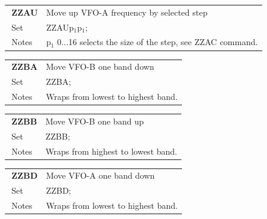 \documentclass[12pt]{book}
\begin{document}
\begin{center}
\begin{tabular}{|p{2cm}|p{11cm}|}
\toprule
$\phantom{\Big|}$\textbf{\large ZZAU} & Move up VFO-A frequency by selected step \\\cline{1-2}
$\phantom{\Big|}${\large Set} & {ZZAUp$_1$p$_1$;} \\\hline
$\phantom{\Big|}${\large Notes} & \multicolumn{1}{|p{11cm}|}{p$_1$ 0...16 selects the size of the step, see ZZAC command.} \\
\bottomrule
\end{tabular}
\end{center}

\begin{center}
\begin{tabular}{|p{2cm}|p{11cm}|}
\toprule
$\phantom{\Big|}$\textbf{\large ZZBA} & Move VFO-B one band down \\\cline{1-2}
$\phantom{\Big|}${\large Set} & {ZZBA;} \\\hline
$\phantom{\Big|}${\large Notes} & \multicolumn{1}{|p{11cm}|}{Wraps from lowest to highest band.} \\
\bottomrule
\end{tabular}
\end{center}

\begin{center}
\begin{tabular}{|p{2cm}|p{11cm}|}
\toprule
$\phantom{\Big|}$\textbf{\large ZZBB} & Move VFO-B one band up \\\cline{1-2}
$\phantom{\Big|}${\large Set} & {ZZBB;} \\\hline
$\phantom{\Big|}${\large Notes} & \multicolumn{1}{|p{11cm}|}{Wraps from highest to lowest band.} \\
\bottomrule
\end{tabular}
\end{center}

\begin{center}
\begin{tabular}{|p{2cm}|p{11cm}|}
\toprule
$\phantom{\Big|}$\textbf{\large ZZBD} & Move VFO-A one band down \\\cline{1-2}
$\phantom{\Big|}${\large Set} & {ZZBD;} \\\hline
$\phantom{\Big|}${\large Notes} & \multicolumn{1}{|p{11cm}|}{Wraps from lowest to highest band.} \\
\bottomrule
\end{tabular}
\end{center}
\end{document}
